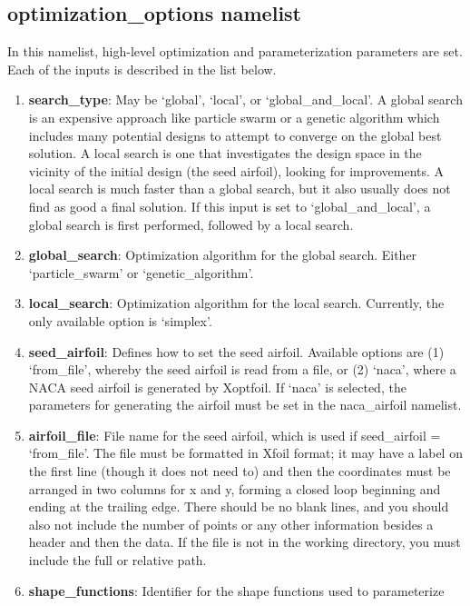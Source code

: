 \documentclass[11pt]{article}
\begin{document}
\subsection{optimization\_options namelist}

In this namelist, high-level optimization and parameterization parameters are set.  Each
of the inputs is described in the list below.

\begin{enumerate}
\item{\textbf{search\_type}: May be `global', `local', or `global\_and\_local'.
A global search is an expensive approach like particle swarm or a genetic algorithm which
includes many potential designs to attempt to converge on the global best solution.  A
local search is one that investigates the design space in the vicinity of the initial
design (the seed airfoil), looking for improvements.  A local search is much faster than
a global search, but it also usually does not find as good a final solution.  If this
input is set to `global\_and\_local', a global search is first performed, followed by a
local search.}
\item{\textbf{global\_search}: Optimization algorithm for the global search.  Either
`particle\_swarm' or `genetic\_algorithm'.}
\item{\textbf{local\_search}: Optimization algorithm for the local search.  Currently, the
only available option is `simplex'.}
\item{\textbf{seed\_airfoil}: Defines how to set the seed airfoil.  Available options are
(1) `from\_file', whereby the seed airfoil is read from a file, or (2) `naca', where a
NACA seed airfoil is generated by Xoptfoil. If `naca' is selected, the parameters for
generating the airfoil must be set in the naca\_airfoil namelist.}
\item{\textbf{airfoil\_file}: File name for the seed airfoil, which is used if
seed\_airfoil = `from\_file'.  The file must be formatted in Xfoil format; it may have a
label on the first line (though it does not need to) and then the coordinates must be
arranged in two columns for x and y, forming a closed loop beginning and ending at the
trailing edge. There should be no blank lines, and you should also not include the number
of points or any other information besides a header and then the data.  If the file is not 
in the working directory, you must include the full or relative path.}
\item{\textbf{shape\_functions}: Identifier for the shape functions used to parameterize
}
\end{enumerate}
\end{document}
